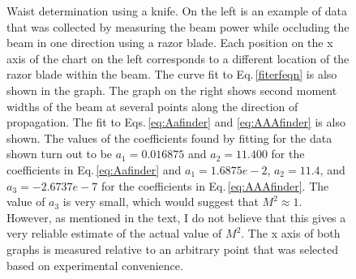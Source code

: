 \begin{figure}
{%
Waist determination using a knife. On the left is an example of data that was collected by measuring the beam power while occluding the beam in one direction using a razor blade. Each position on the x axis of the chart on the left corresponds to a different location of the razor blade within the beam. The curve fit to Eq.\,\ref{fiterfeqn} is also shown in the graph.
The graph on the right shows second moment widths of the beam at several points along the direction of propagation. The fit to Eqs.\,\ref{eq:Aafinder} and \ref{eq:AAAfinder} is also shown. 
The values of the coefficients found by fitting for the data shown turn out to be $a_1=0.016875$ and $a_2=11.400$ for the coefficients in Eq.\,\ref{eq:Aafinder} and $a_1=1.6875e-2$, $a_2 = 11.4$, and $a_3=-2.6737e-7$ for the coefficients in Eq.\,\ref{eq:AAAfinder}. The value of $a_3$ is very small, which would suggest that $M^2\approx1$. However, as mentioned in the text, I do not believe that this gives a very reliable estimate of the actual value of $M^2$. The x axis of both graphs is measured relative to an arbitrary point that was selected based on experimental convenience.
}
\end{figure}

